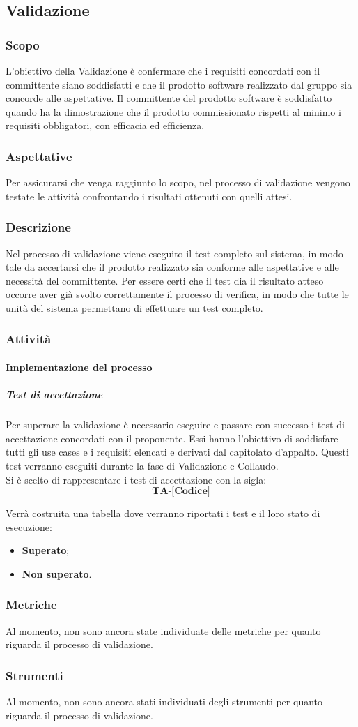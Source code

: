 \subsection{Validazione}
\subsubsection{Scopo}
L’obiettivo della Validazione è confermare che i requisiti concordati con il committente siano soddisfatti e che il prodotto software realizzato dal gruppo sia concorde alle aspettative.
Il committente del prodotto software è soddisfatto quando ha la dimostrazione che il prodotto commissionato rispetti al minimo i requisiti obbligatori, con efficacia ed efficienza.
\subsubsection{Aspettative}
Per assicurarsi che venga raggiunto lo scopo, nel processo di validazione vengono testate le attività confrontando i risultati ottenuti con quelli attesi.
\subsubsection{Descrizione}
Nel processo di validazione viene eseguito il test completo sul sistema, in modo tale da accertarsi che il prodotto realizzato sia conforme alle aspettative e alle necessità del committente. 
Per essere certi che il test dia il risultato atteso occorre aver già svolto correttamente il processo di verifica, in modo che tutte le unità del sistema permettano di effettuare un test completo.
\subsubsection{Attività}
\paragraph{Implementazione del processo}
\subparagraph*{Test di accettazione}
Per superare la validazione è necessario eseguire e passare con successo i test di accettazione concordati con il proponente. Essi hanno l'obiettivo di soddisfare tutti gli use cases e i requisiti elencati e derivati dal capitolato d'appalto. Questi test verranno eseguiti durante la fase di Validazione e Collaudo.\\
Si è scelto di rappresentare i test di accettazione con la sigla:
$$\textbf{TA-[Codice]}$$

Verrà costruita una tabella dove verranno riportati i test e il loro stato di esecuzione:
\begin{itemize}
\item	\textbf{Superato};
\item	\textbf{Non superato}.
\end{itemize}
\subsubsection{Metriche}
Al momento, non sono ancora state individuate delle metriche per quanto riguarda il processo di validazione.
\subsubsection{Strumenti}
Al momento, non sono ancora stati individuati degli strumenti per quanto riguarda il processo di validazione.

